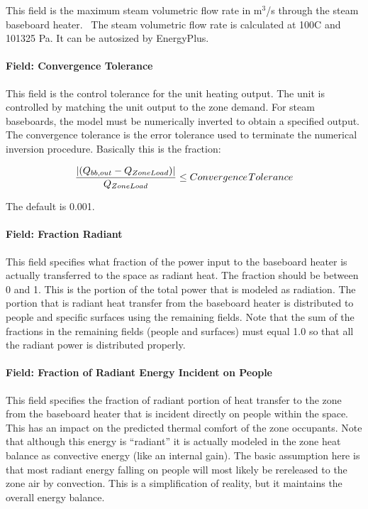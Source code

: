 This field is the maximum steam volumetric flow rate in m\(^{3}\)/s through the steam baseboard heater.~ The steam volumetric flow rate is calculated at 100C and 101325 Pa. It can be autosized by EnergyPlus.

\paragraph{Field: Convergence Tolerance}\label{field-convergence-tolerance-1-000}

This field is the control tolerance for the unit heating output. The unit is controlled by matching the unit output to the zone demand. For steam baseboards, the model must be numerically inverted to obtain a specified output. The convergence tolerance is the error tolerance used to terminate the numerical inversion procedure. Basically this is the fraction:

\begin{equation}
\frac{{\left| {({Q_{bb,out}} - {Q_{ZoneLoad}})} \right|}}{{{Q_{ZoneLoad}}}} \le Convergence{\kern 1pt} Tolerance
\end{equation}

The default is 0.001.

\paragraph{Field: Fraction Radiant}\label{field-fraction-radiant-1-000}

This field specifies what fraction of the power input to the baseboard heater is actually transferred to the space as radiant heat. The fraction should be between 0 and 1. This is the portion of the total power that is modeled as radiation. The portion that is radiant heat transfer from the baseboard heater is distributed to people and specific surfaces using the remaining fields. Note that the sum of the fractions in the remaining fields (people and surfaces) must equal 1.0 so that all the radiant power is distributed properly.

\paragraph{Field: Fraction of Radiant Energy Incident on People}\label{field-fraction-of-radiant-energy-incident-on-people-1}

This field specifies the fraction of radiant portion of heat transfer to the zone from the baseboard heater that is incident directly on people within the space. This has an impact on the predicted thermal comfort of the zone occupants. Note that although this energy is ``radiant'' it is actually modeled in the zone heat balance as convective energy (like an internal gain). The basic assumption here is that most radiant energy falling on people will most likely be rereleased to the zone air by convection. This is a simplification of reality, but it maintains the overall energy balance.

